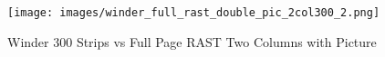 \documentclass[conference]{IEEEtran}
\begin{document}
\begin{figure}[winder-300-double-pic-2col300]
\texttt{[image: images/winder\_full\_rast\_double\_pic\_2col300\_2.png]}
\caption{Winder 300 Strips vs Full Page RAST Two Columns with Picture}
\label{fig:winder-300-double-pic-2col300}
\end{figure}





\end{document}
